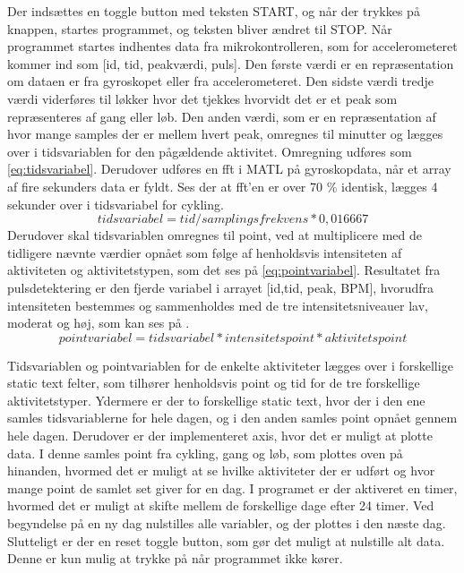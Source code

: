 Der indsættes en toggle button med teksten START, og når der trykkes på knappen, startes programmet, og teksten bliver ændret til STOP. Når programmet startes indhentes data fra mikrokontrolleren, som for accelerometeret kommer ind som [id, tid, peakværdi, puls]. Den første værdi er en repræsentation om dataen er fra gyroskopet eller fra accelerometeret. Den sidste værdi tredje værdi viderføres til løkker hvor det tjekkes hvorvidt det er et peak som repræsenteres af gang eller løb. Den anden værdi, som er en repræsentation af hvor mange samples der er mellem hvert peak, omregnes til minutter og lægges over i tidsvariablen for den pågældende aktivitet. Omregning udføres som \eqref{eq:tidsvariabel}. Derudover udføres en fft i MATL på gyroskopdata, når et array af fire sekunders data er fyldt. Ses der at fft'en er over 70 \% identisk, lægges 4 sekunder over i tidsvariabel for cykling. 
\begin{equation}
\label{eq:tidsvariabel}
	tidsvariabel = tid/samplingsfrekvens*0,016667
\end{equation}
Derudover skal tidsvariablen omregnes til point, ved at multiplicere med de tidligere nævnte værdier opnået som følge af henholdsvis intensiteten af aktiviteten og aktivitetstypen, som det ses på \eqref{eq:pointvariabel}. Resultatet fra pulsdetektering er den fjerde variabel i arrayet [id,tid, peak, BPM], hvorudfra intensiteten bestemmes og sammenholdes med de tre intensitetsniveauer lav, moderat og høj, som kan ses på . 
\begin{equation}
\label{eq:pointvariabel}
pointvariabel = tidsvariabel*intensitetspoint*aktivitetspoint
\end{equation}

Tidsvariablen og pointvariablen for de enkelte aktiviteter lægges over i forskellige static text felter, som tilhører henholdsvis point og tid for de tre forskellige aktivitetstyper. Ydermere er der to forskellige static text, hvor der i den ene samles tidsvariablerne for hele dagen, og i den anden samles point opnået gennem hele dagen. 
Derudover er der implementeret axis, hvor det er muligt at plotte data. I denne samles point fra cykling, gang og løb, som plottes oven på hinanden, hvormed det er muligt at se hvilke aktiviteter der er udført og hvor mange point de samlet set giver for en dag. 
I programet er der aktiveret en timer, hvormed det er muligt at skifte mellem de forskellige dage efter 24 timer. Ved begyndelse på en ny dag nulstilles alle variabler, og der plottes i den næste dag. Slutteligt er der en reset toggle button, som gør det muligt at nulstille alt data. Denne er kun mulig at trykke på når programmet ikke kører. 

